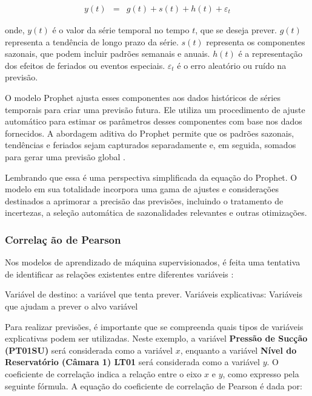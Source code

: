 \begin{eqnarray}
	 y(t) &=& g(t) + s(t) + h(t) + \varepsilon_t 
\end{eqnarray}

\noindent onde, \( y(t) \) é o valor da série temporal no tempo \( t \), que se deseja prever. \( g(t) \) representa a tendência de longo prazo da série. \( s(t) \) representa os componentes sazonais, que podem incluir padrões semanais e anuais. \( h(t) \) é a representação dos efeitos de feriados ou eventos especiais. \( \varepsilon_t \) é o erro aleatório ou ruído na previsão.


O modelo Prophet ajusta esses componentes aos dados históricos de séries temporais para criar uma previsão futura. Ele utiliza um procedimento de ajuste automático para estimar os parâmetros desses componentes com base nos dados fornecidos. A abordagem aditiva do Prophet permite que os padrões sazonais, tendências e feriados sejam capturados separadamente e, em seguida, somados para gerar uma previsão global \cite{2-s2.0-85092514286}.

Lembrando que essa é uma perspectiva simplificada da equação do Prophet. O modelo em sua totalidade incorpora uma gama de ajustes e considerações destinados a aprimorar a precisão das previsões, incluindo o tratamento de incertezas, a seleção automática de sazonalidades relevantes e outras otimizações. 



\subsubsection{Correla\c c \~ao de Pearson}

Nos modelos de aprendizado de máquina supervisionados, é feita uma tentativa de identificar as relações existentes entre diferentes variáveis \cite{korstanje2021}:

Variável de destino: a variável que tenta prever.
Variáveis explicativas: Variáveis que ajudam a prever o alvo variável


Para realizar previsões, é importante que se compreenda quais tipos de variáveis explicativas podem ser utilizadas. Neste exemplo, a variável \textbf{Pressão de Sucção (PT01SU)} será considerada como a variável $x$, enquanto a variável \textbf{Nível do Reservatório (Câmara 1) LT01} será considerada como a variável $y$. O coeficiente de correlação indica a relação entre o eixo $x$ e $y$, como expresso pela seguinte fórmula.
A equação do coeficiente de correlação de Pearson é dada por:


